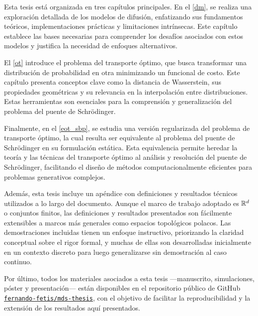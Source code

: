 Esta tesis está organizada en tres capítulos principales. En el \autoref{dm}, se realiza una exploración detallada de los modelos de difusión, enfatizando sus fundamentos teóricos, implementaciones prácticas y limitaciones intrínsecas. Este capítulo establece las bases necesarias para comprender los desafíos asociados con estos modelos y justifica la necesidad de enfoques alternativos. 

El \autoref{ot} introduce el problema del transporte óptimo, que busca transformar una distribución de probabilidad en otra minimizando un funcional de costo. Este capítulo presenta conceptos clave como la distancia de Wasserstein, sus propiedades geométricas y su relevancia en la interpolación entre distribuciones. Estas herramientas son esenciales para la comprensión y generalización del problema del puente de Schrödinger.

Finalmente, en el \autoref{eot_sbp}, se estudia una versión regularizada del problema de transporte óptimo, la cual resulta ser equivalente al problema del puente de Schrödinger en su formulación estática. Esta equivalencia permite heredar la teoría y las técnicas del transporte óptimo al análisis y resolución del puente de Schrödinger, facilitando el diseño de métodos computacionalmente eficientes para problemas generativos complejos.

Además, esta tesis incluye un apéndice con definiciones y resultados técnicos utilizados a lo largo del documento. Aunque el marco de trabajo adoptado es $\mathbb{R}^d$ o conjuntos finitos, las definiciones y resultados presentados son fácilmente extensibles a marcos más generales como espacios topológicos polacos. Las demostraciones incluidas tienen un enfoque instructivo, priorizando la claridad conceptual sobre el rigor formal, y muchas de ellas son desarrolladas inicialmente en un contexto discreto para luego generalizarse sin demostración al caso continuo.

Por último, todos los materiales asociados a esta tesis —manuscrito, simulaciones, póster y presentación— están disponibles en el repositorio público de GitHub \href{https://github.com/fernando-fetis/mds-thesis}{\texttt{fernando-fetis/mds-thesis}}, con el objetivo de facilitar la reproducibilidad y la extensión de los resultados aquí presentados.